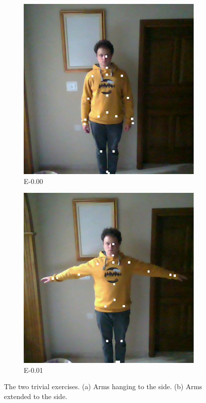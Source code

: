 \begin{figure}[ht]
  \centering
  \begin{subfigure}[b]{0.16\linewidth}
      \centering
      \includegraphics[width=\textwidth]{figures/samples/trivial/E-0.00_10.png}
      \caption[]{E-0.00}
  \end{subfigure}
  \hfill
  \begin{subfigure}[b]{0.16\linewidth}
      \centering
      \includegraphics[width=\textwidth]{figures/samples/trivial/E-0.01_38.png}
      \caption[]{E-0.01}
  \end{subfigure}
  \caption[Trivial Exercises]{The two trivial exercises. (a) Arms hanging to the side. (b) Arms extended to the side.}
  \label{fig:trivial_exercises}
\end{figure}  

